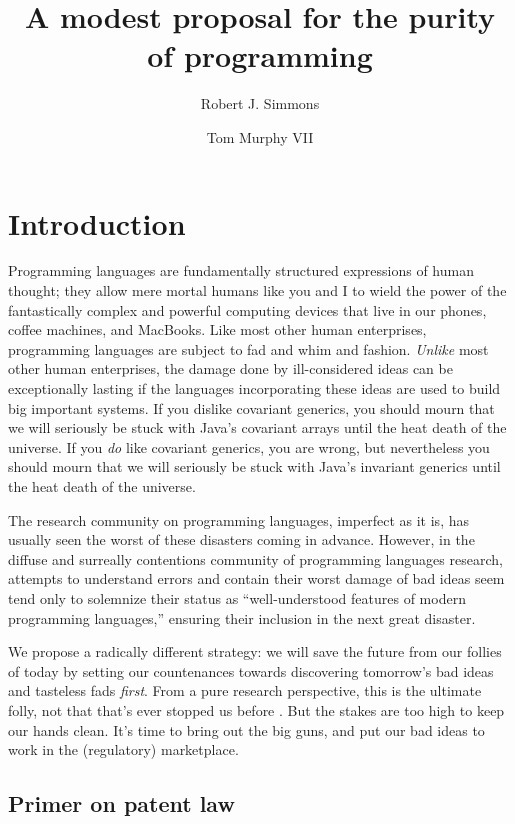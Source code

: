 \documentclass[acmtocl]%
{boviktrans}
\title{A modest proposal for the purity of programming}
\author{Robert J. Simmons \and Tom Murphy VII}
\begin{document}
\maketitle

\section{Introduction}

Programming languages are fundamentally structured expressions of
human thought; they allow mere mortal humans like you and I to wield
the power of the fantastically complex and powerful computing devices
that live in our phones, coffee machines, and MacBooks. Like most
other human enterprises, programming languages are subject to fad and
whim and fashion. {\it Unlike} most other human enterprises, the
damage done by ill-considered ideas can be exceptionally lasting if
the languages incorporating these ideas are used to build big
important systems. If you dislike covariant generics, you should mourn
that we will seriously be stuck with Java's covariant arrays until the
heat death of the universe. If you {\it do} like covariant generics,
you are wrong, but nevertheless you should mourn that we will
seriously be stuck with Java's invariant generics until the heat death
of the universe.

The research community on programming languages, imperfect as it is,
has usually seen the worst of these disasters coming in
advance. However, in the diffuse and surreally contentions community
of programming languages research, attempts to understand errors and
contain their worst damage of bad ideas seem tend only to solemnize
their status as ``well-understood features of modern programming
languages,'' ensuring their inclusion in the next great disaster.

We propose a radically different strategy: we will save the future
from our follies of today by setting our countenances towards
discovering tomorrow's bad ideas and tasteless fads {\it first}. From a
pure research perspective, this is the ultimate folly, not that that's
ever stopped us before
\cite{sigbovik07,sigbovik08,sigbovik09,sigbovik10,sigbovik11}. But the
stakes are too high to keep our hands clean. It's time to bring out
the big guns, and put our bad ideas to work in the (regulatory)
marketplace.

\subsection{Primer on patent law}
\end{document}
